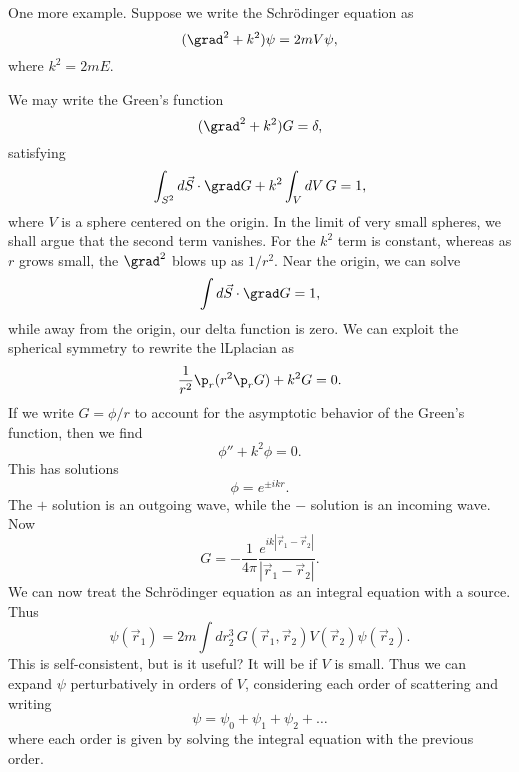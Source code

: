 One more example. Suppose we write the Schr\"odinger equation as
\begin{equation}
    (\grad^2 + k^2) \psi = 2mV \psi,
\end{equation}
where $k^2 = 2mE$.

We may write the Green's function
\begin{equation}
    (\grad^2 +k^2)G =\delta,
\end{equation}
satisfying
\begin{equation}
    \int_{S^2} d\vec{S} \cdot \grad G + k^2 \int_V dV \,G = 1,
\end{equation}
where $V$ is a sphere centered on the origin. In the limit of very small spheres, we shall argue that the second term vanishes. For the $k^2$ term is constant, whereas as $r$ grows small, the $\grad^2$ blows up as $1/r^2$. Near the origin, we can solve
\begin{equation}
    \int d\vec{S} \cdot \grad G =1,
\end{equation}
while away from the origin, our delta function is zero. We can exploit the spherical symmetry to rewrite the lLplacian as
\begin{equation}
    \frac{1}{r^2} \p_r(r^2 \p_r G) + k^2 G =0.
\end{equation}
If we write $G=\phi/r$ to account for the asymptotic behavior of the Green's function, then we find
\begin{equation}
    \phi'' + k^2 \phi=0.
\end{equation}
This has solutions
\begin{equation}
    \phi = e^{\pm ikr}.
\end{equation}
The $+$ solution is an outgoing wave, while the $-$ solution is an incoming wave. Now
\begin{equation}
    G = -\frac{1}{4\pi} \frac{e^{ik |\vec r_1 - \vec r_2|}}{|\vec r_1 - \vec r_2|}.
\end{equation}
We can now treat the Schr\"odinger equation as an integral equation with a source. Thus
\begin{equation}
    \psi(\vec r_1) = 2m \int dr_2^3\, G(\vec r_1, \vec r_2) V(\vec r_2) \psi(\vec r_2).
\end{equation}
This is self-consistent, but is it useful? It will be if $V$ is small. Thus we can expand $\psi$ perturbatively in orders of $V$, considering each order of scattering and writing
\begin{equation}
    \psi = \psi_0 + \psi_1 + \psi_2 + \dots
\end{equation}
where each order is given by solving the integral equation with the previous order.